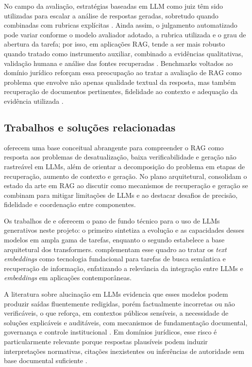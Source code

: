 No campo da avaliação, estratégias baseadas em LLM como juiz têm sido utilizadas para escalar a análise de respostas geradas, sobretudo quando combinadas com rubricas explícitas \parencite{liuEtAl2023geval,liuEtAl2025judgeRag}. Ainda assim, o julgamento automatizado pode variar conforme o modelo avaliador adotado, a rubrica utilizada e o grau de abertura da tarefa; por isso, em aplicações RAG, tende a ser mais robusto quando tratado como instrumento auxiliar, combinado a evidências qualitativas, validação humana e análise das fontes recuperadas \parencite{liuEtAl2025judgeRag,liuEtAl2023geval,saadFalconEtAl2024ares,esEtAl2023ragas}. Benchmarks voltados ao domínio jurídico reforçam essa preocupação ao tratar a avaliação de RAG como problema que envolve não apenas qualidade textual da resposta, mas também recuperação de documentos pertinentes, fidelidade ao contexto e adequação da evidência utilizada \parencite{pipitoneAlami2024legalbenchRag}.

\subsection{Trabalhos e soluções relacionadas}

\textcite{gao2023ragSurvey} oferecem uma base conceitual abrangente para compreender o RAG como resposta aos problemas de desatualização, baixa verificabilidade e geração não rastreável em LLMs, além de orientar a decomposição do problema em etapas de recuperação, aumento de contexto e geração. No plano arquitetural, \textcite{gupta2024comprehensiveRag} consolidam o estado da arte em RAG ao discutir como mecanismos de recuperação e geração se combinam para mitigar limitações de LLMs e ao destacar desafios de precisão, fidelidade e coordenação entre componentes.

Os trabalhos de \textcite{minaee2024llmSurvey} e \textcite{vaswani2017attention} oferecem o pano de fundo técnico para o uso de LLMs generativos neste projeto: o primeiro sintetiza a evolução e as capacidades desses modelos em ampla gama de tarefas, enquanto o segundo estabelece a base arquitetural dos transformers. \textcite{nie2024textEmbeddingSurvey} complementam esse quadro ao tratar os \textit{text embeddings} como tecnologia fundacional para tarefas de busca semântica e recuperação de informação, enfatizando a relevância da integração entre LLMs e \textit{embeddings} em aplicações contemporâneas.

A literatura sobre alucinação em LLMs evidencia que esses modelos podem produzir saídas fluentemente redigidas, porém factualmente incorretas ou não verificáveis, o que reforça, em contextos públicos sensíveis, a necessidade de soluções explicáveis e auditáveis, com mecanismos de fundamentação documental, governança e controle institucional \parencite{anhHoang2025hallucinations,gao2023ragSurvey,deAlmeidaSantos2025aiGovernance}. Em domínios jurídicos, esse risco é particularmente relevante porque respostas plausíveis podem induzir interpretações normativas, citações inexistentes ou inferências de autoridade sem base documental suficiente \parencite{dahlEtAl2024largeLegalFictions}.

